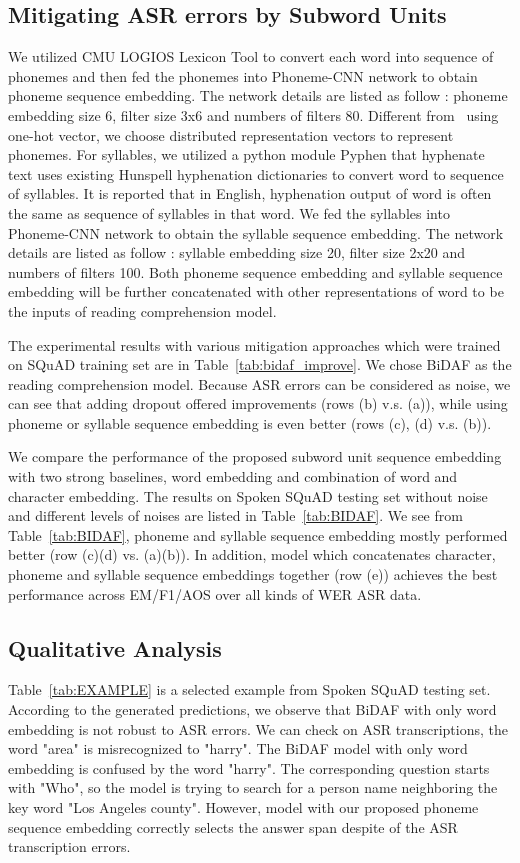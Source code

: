 \documentclass[a4paper]{article}
\begin{document}
\subsection{Mitigating ASR errors by Subword Units}
We utilized CMU LOGIOS Lexicon Tool to convert each word into sequence of phonemes and then fed the phonemes into Phoneme-CNN network to obtain phoneme sequence embedding.  The network details are listed as follow : phoneme embedding size 6, filter size 3x6 and numbers of filters 80.  Different from~\cite{li2016phoneme} using one-hot vector, we choose distributed representation vectors to represent phonemes.
For syllables, we utilized a python module Pyphen that hyphenate text uses existing Hunspell hyphenation dictionaries to convert word to sequence of syllables. It is reported that in English, hyphenation output of word is often the same as sequence of syllables in that word. 
We fed the syllables into Phoneme-CNN network to obtain the syllable sequence embedding. The network details are listed as follow : syllable embedding size 20, filter size 2x20 and numbers of filters 100. Both phoneme sequence embedding and syllable sequence embedding will be further concatenated with other representations of word to be the inputs of reading comprehension model. 


The experimental results with various mitigation approaches which were trained on SQuAD training set are in Table~\ref{tab:bidaf_improve}. We chose  BiDAF as the reading comprehension model. 
Because ASR errors can be considered as noise, we can see that adding dropout offered improvements (rows (b) v.s. (a)), while using phoneme or syllable sequence embedding is even better (rows (c), (d) v.s. (b)). 


We compare the performance of the proposed subword unit sequence embedding with two strong baselines, word embedding and combination of word and character embedding. 
The results on Spoken SQuAD testing set without noise and different levels of noises are listed in Table~\ref{tab:BIDAF}. 
We see from Table~\ref{tab:BIDAF}, phoneme and syllable sequence embedding mostly performed better (row (c)(d) vs. (a)(b)). 
In addition, model which concatenates character, phoneme and syllable sequence embeddings together (row (e)) achieves the best performance across EM/F1/AOS over all kinds of WER ASR data.  



\subsection{Qualitative Analysis}
Table~\ref{tab:EXAMPLE} is a selected example from Spoken SQuAD testing set.
According to the generated predictions, we observe that BiDAF with only word embedding is not robust to ASR errors.  
We can check on ASR transcriptions, the word "area" is misrecognized to "harry". 
The BiDAF model with only word embedding is confused by the word "harry". The corresponding question starts with "Who", so the model is trying to search for a person name neighboring the key word "Los Angeles county". However, model with our proposed phoneme sequence embedding correctly selects the answer span despite of the ASR transcription errors.
\end{document}
